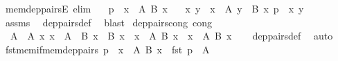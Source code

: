 \begin{isabellebody}
%
\isadelimproof
%
\endisadelimproof
\isanewline
\isanewline
{}\isamarkupfalse%
\ mem{\isacharunderscore}{\kern0pt}dep{\isacharunderscore}{\kern0pt}pairsE\ {\isacharbrackleft}{\kern0pt}elim{\isacharbang}{\kern0pt}{\isacharbrackright}{\kern0pt}{\isacharcolon}{\kern0pt}\isanewline
\ \ \ {\isachardoublequoteopen}p\ {\isasymin}\ {\isasymSum}x\ {\isasymin}\ A{\isachardot}{\kern0pt}\ B\ x{\isachardoublequoteclose}\isanewline
\ \ \ x\ y\ \ {\isachardoublequoteopen}x\ {\isasymin}\ A{\isachardoublequoteclose}\ {\isachardoublequoteopen}y\ {\isasymin}\ B\ x{\isachardoublequoteclose}\ {\isachardoublequoteopen}p\ {\isacharequal}{\kern0pt}\ {\isasymlangle}x{\isacharcomma}{\kern0pt}\ y{\isasymrangle}{\isachardoublequoteclose}\isanewline
%
\isadelimproof
\ \ %
\endisadelimproof
%
\isatagproof
{}\isamarkupfalse%
\ assms\ \isamarkupfalse%
\ dep{\isacharunderscore}{\kern0pt}pairs{\isacharunderscore}{\kern0pt}def\ \isamarkupfalse%
\ blast%
\endisatagproof
{\isafoldproof}%
%
\isadelimproof
\isanewline
%
\endisadelimproof
\isanewline
{}\isamarkupfalse%
\ dep{\isacharunderscore}{\kern0pt}pairs{\isacharunderscore}{\kern0pt}cong\ {\isacharbrackleft}{\kern0pt}cong{\isacharbrackright}{\kern0pt}{\isacharcolon}{\kern0pt}\isanewline
\ \ {\isachardoublequoteopen}{\isasymlbrakk}A\ {\isacharequal}{\kern0pt}\ A{\isacharprime}{\kern0pt}{\isacharsemicolon}{\kern0pt}\ {\isasymAnd}x{\isachardot}{\kern0pt}\ x\ {\isasymin}\ A{\isacharprime}{\kern0pt}\ {\isasymLongrightarrow}\ B\ x\ {\isacharequal}{\kern0pt}\ B{\isacharprime}{\kern0pt}\ x{\isasymrbrakk}\ {\isasymLongrightarrow}\ {\isacharparenleft}{\kern0pt}{\isasymSum}x\ {\isasymin}\ A{\isachardot}{\kern0pt}\ B\ x{\isacharparenright}{\kern0pt}\ {\isacharequal}{\kern0pt}\ {\isacharparenleft}{\kern0pt}{\isasymSum}x\ {\isasymin}\ A{\isacharprime}{\kern0pt}{\isachardot}{\kern0pt}\ B{\isacharprime}{\kern0pt}\ x{\isacharparenright}{\kern0pt}{\isachardoublequoteclose}\isanewline
%
\isadelimproof
\ \ %
\endisadelimproof
%
\isatagproof
{}\isamarkupfalse%
\ dep{\isacharunderscore}{\kern0pt}pairs{\isacharunderscore}{\kern0pt}def\ \isamarkupfalse%
\ auto%
\endisatagproof
{\isafoldproof}%
%
\isadelimproof
\isanewline
%
\endisadelimproof
\isanewline
{}\isamarkupfalse%
\ fst{\isacharunderscore}{\kern0pt}mem{\isacharunderscore}{\kern0pt}if{\isacharunderscore}{\kern0pt}mem{\isacharunderscore}{\kern0pt}dep{\isacharunderscore}{\kern0pt}pairs{\isacharcolon}{\kern0pt}\ {\isachardoublequoteopen}p\ {\isasymin}\ {\isasymSum}x\ {\isasymin}\ A{\isachardot}{\kern0pt}\ B\ x\ {\isasymLongrightarrow}\ fst\ p\ {\isasymin}\ A{\isachardoublequoteclose}\isanewline

\end{isabellebody}
